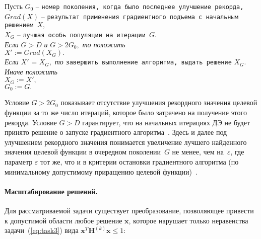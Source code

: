 \begin{flushleft}
\small
Пусть
$G_0$ -- \verb"номер поколения, когда было последнее улучшение рекорда,"\\
$Grad(X)$ -- \verb"результат применения градиентного подъема с начальным решением "$X,$\\
$X_G$ -- \verb"лучшая особь популяции на итерации "$G.$\\
$\mbox{ }$\\

\textit{Если} $G > D$ \textit{и} $G > 2 G_0,$ \textit{то положить} \\
\leftskip=12pt
    $X' := Grad(X_G).$\\
    \textit{Если} $X'$ = $X_G,$ \textit{то} \verb"завершить выполнение алгоритма, выдать решение" $X_G.$\\
    \textit{Иначе положить} \\
    \leftskip=24pt
        $X_G := X',$\\
        $G_0 := G.$\\
        \leftskip=12pt
\end{flushleft}
Условие $G > 2 G_0$ показывает отсутствие улучшения рекордного значения целевой функции за то же число итераций,
которое было затрачено на получение этого рекорда.
Условие $G > D$ гарантирует, что на начальных итерациях ДЭ не будет принято решение о запуске градиентного
алгоритма~\cite{BN98,HK93}. Здесь и далее под улучшением рекордного значения понимается увеличение лучшего
найденного значения целевой функции в очередном поколении~$G$ не менее, чем на~$\varepsilon$, где параметр $\varepsilon$
тот же, что и в критерии остановки градиентного алгоритма (по минимальному допустимому приращению целевой функции)~\cite{tyu:daor}.

\paragraph*{Масштабирование решений.}
Для рассматриваемой задачи существует преобразование, позволяющее привести к
допустимой области любое решение $\textbf{x}$, которое нарушает только неравенства задачи~(\ref{eq:task3}) вида
$\textbf{x}^{T}\textbf{H}^{(k)}\textbf{x} \leq 1$:

